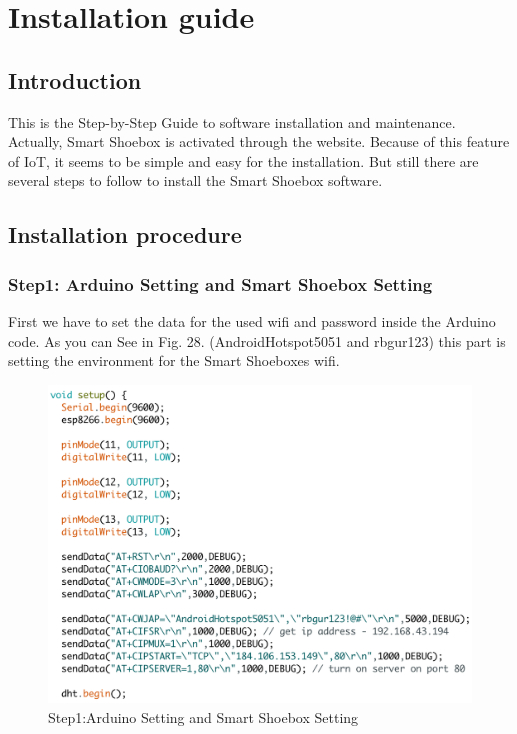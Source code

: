 \documentclass[conference]{IEEEtran}
\begin{document}
\section{Installation guide}
\subsection{Introduction}
This is the Step-by-Step Guide to software installation and maintenance. Actually, Smart Shoebox is activated through the website. Because of this feature of IoT, it seems to be simple and easy for the installation. But still there are several steps to follow to install the Smart Shoebox software.
\subsection{Installation procedure}
\subsubsection{Step1: Arduino Setting and Smart Shoebox Setting}
First we have to set the data for the used wifi and password inside the Arduino code. As you can See in Fig. 28.  (AndroidHotspot5051 and rbgur123) this part is setting the environment for the Smart Shoeboxes wifi.
\begin{figure}[H]
\begin{center}
    \includegraphics[scale=0.47]{step1}
    \caption{Step1:Arduino Setting and Smart Shoebox Setting} \label{fig:label}
\end{center}
\end{figure}
\end{document}
